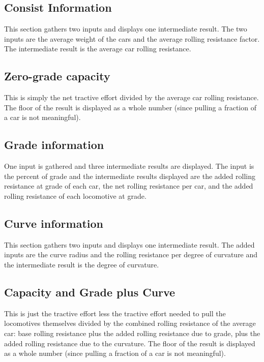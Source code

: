 \subsection{Consist Information}
This section gathers two inputs and displays one intermediate result. 
The two inputs are the average weight of the cars and the average
rolling resistance factor.  The intermediate result is the average car
rolling resistance.

\subsection{Zero-grade capacity}
This is simply the net tractive effort divided by the average car
rolling resistance.  The floor of the result is displayed as a whole
number (since pulling a fraction of a car is not meaningful).

\subsection{Grade information}
One input is gathered and three intermediate results are displayed.  The
input is the percent of grade and the intermediate results displayed are
the added rolling resistance at grade of each car, the net rolling
resistance per car, and the added rolling resistance of each locomotive
at grade.

\subsection{Curve information}
This section gathers two inputs and displays one intermediate result.
The added inputs are the curve radius and the rolling resistance per
degree of curvature and the intermediate result is the degree of
curvature. 

\subsection{Capacity and Grade plus Curve}
This is just the tractive effort less the tractive effort needed to
pull the locomotives themselves divided by the combined rolling
resistance of the average car: base rolling resistance plus the added
rolling resistance due to grade, plus the added rolling resistance due
to the curvature.  The floor of the result is displayed as a whole
number (since pulling a fraction of a car is not meaningful).



